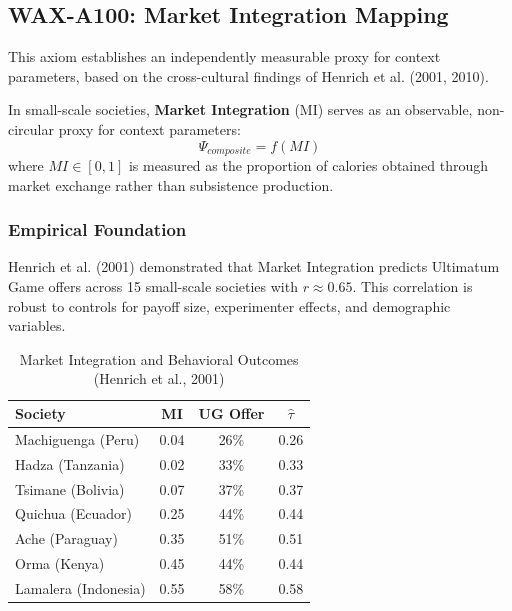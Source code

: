 
\subsection{WAX-A100: Market Integration Mapping}
\label{sec:wax-a100}

This axiom establishes an independently measurable proxy for context parameters, based on the cross-cultural findings of Henrich et al. (2001, 2010).

\begin{axiom}
\label{ax:market-integration}
In small-scale societies, \textbf{Market Integration} (MI) serves as an observable, non-circular proxy for context parameters:
\begin{equation}
\Psi_{composite} = f(MI)
\end{equation}
where $MI \in [0,1]$ is measured as the proportion of calories obtained through market exchange rather than subsistence production.
\end{axiom}

\subsubsection{Empirical Foundation}

Henrich et al. (2001) demonstrated that Market Integration predicts Ultimatum Game offers across 15 small-scale societies with $r \approx 0.65$. This correlation is robust to controls for payoff size, experimenter effects, and demographic variables.

\begin{table}[htbp]
\centering
\caption{Market Integration and Behavioral Outcomes (Henrich et al., 2001)}
\label{tab:mi-data}
\renewcommand{\arraystretch}{1.2}
\begin{tabular}{@{}lccc@{}}
\toprule
\textbf{Society} & \textbf{MI} & \textbf{UG Offer} & $\hat{\tau}$ \\
\midrule
Machiguenga (Peru) & 0.04 & 26\% & 0.26 \\
Hadza (Tanzania) & 0.02 & 33\% & 0.33 \\
Tsimane (Bolivia) & 0.07 & 37\% & 0.37 \\
Quichua (Ecuador) & 0.25 & 44\% & 0.44 \\
Ache (Paraguay) & 0.35 & 51\% & 0.51 \\
Orma (Kenya) & 0.45 & 44\% & 0.44 \\
Lamalera (Indonesia) & 0.55 & 58\% & 0.58 \\
\bottomrule
\end{tabular}
\end{table}

